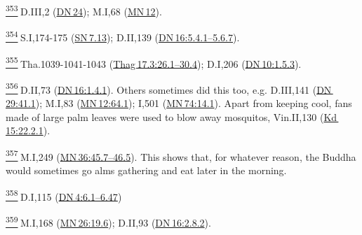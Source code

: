 \label{footprints_split_024.html_fn353}
\hyperref[footprints_split_011.htmlux5cux23fnref353]{\textsuperscript{353}} D.III,2
(\href{https://suttacentral.net/dn24/en/sujato}{DN\,24}); M.I,68
(\href{https://suttacentral.net/mn12/en/sujato}{MN\,12}).

\label{footprints_split_024.html_fn354}
\hyperref[footprints_split_011.htmlux5cux23fnref354]{\textsuperscript{354}} S.I,174-175
(\href{https://suttacentral.net/sn7.13/en/sujato}{SN\,7.13}); D.II,139
(\href{https://suttacentral.net/dn16/en/sujato\#5.4.1}{DN\,16:5.4.1--5.6.7}).

\label{footprints_split_024.html_fn355}
\hyperref[footprints_split_011.htmlux5cux23fnref355]{\textsuperscript{355}} Tha.1039-1041-1043
(\href{https://suttacentral.net/thag17.3/en/sujato\#26.1}{Thag\,17.3:26.1--30.4});
D.I,206
(\href{https://suttacentral.net/dn10/en/sujato\#1.5.3}{DN\,10:1.5.3}).

\label{footprints_split_024.html_fn356}
\hyperref[footprints_split_011.htmlux5cux23fnref356]{\textsuperscript{356}} D.II,73
(\href{https://suttacentral.net/dn16/en/sujato\#1.4.1}{DN\,16:1.4.1}).
Others sometimes did this too, e.g. D.III,141
(\href{https://suttacentral.net/dn29/en/sujato\#41.1}{DN\,29:41.1});
M.I,83
(\href{https://suttacentral.net/mn12/en/sujato\#64.1}{MN\,12:64.1});
I,501
(\href{https://suttacentral.net/mn74/en/sujato\#14.1}{MN\,74:14.1}).
Apart from keeping cool, fans made of large palm leaves were used to
blow away mosquitos, Vin.II,130
(\href{https://suttacentral.net/pli-tv-kd15/en/brahmali\#22.2.1}{Kd\,15:22.2.1}).

\label{footprints_split_024.html_fn357}
\hyperref[footprints_split_011.htmlux5cux23fnref357]{\textsuperscript{357}} M.I,249
(\href{https://suttacentral.net/mn36/en/sujato\#45.7}{MN\,36:45.7--46.5}).
This shows that, for whatever reason, the Buddha would sometimes go alms
gathering and eat later in the morning.

\label{footprints_split_024.html_fn358}
\hyperref[footprints_split_011.htmlux5cux23fnref358]{\textsuperscript{358}} D.I,115
(\href{https://suttacentral.net/dn4/en/sujato\#6.1}{DN\,4:6.1--6.47})

\label{footprints_split_024.html_fn359}
\hyperref[footprints_split_011.htmlux5cux23fnref359]{\textsuperscript{359}} M.I,168
(\href{https://suttacentral.net/mn26/en/sujato\#19.6}{MN\,26:19.6});
D.II,93
(\href{https://suttacentral.net/dn16/en/sujato\#2.8.2}{DN\,16:2.8.2}).

